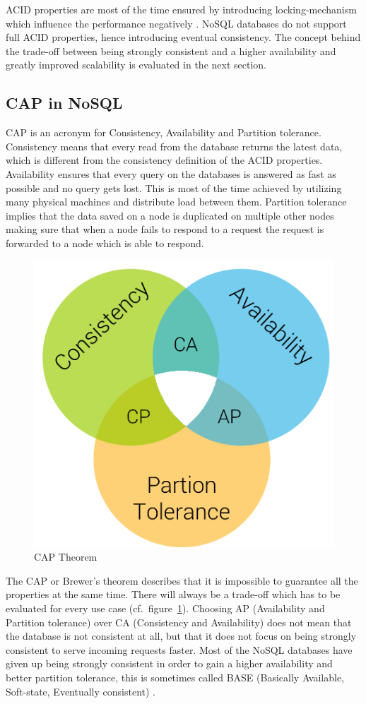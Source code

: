 ACID properties are most of the time ensured by introducing locking-mechanism which influence the performance negatively \cite[1]{hecht.2011}. NoSQL databases do not support full ACID properties, hence introducing eventual consistency. The concept behind the trade-off between being strongly consistent and a higher availability and greatly improved scalability is evaluated in the next section.


\subsection{CAP in NoSQL}
\label{subsec:cap}
CAP is an acronym for Consistency, Availability and Partition tolerance. Consistency means that every read from the database returns the latest data, which is different from the consistency definition of the ACID properties. Availability ensures that every query on the databases is answered as fast as possible and no query gets lost. This is most of the time achieved by utilizing many physical machines and distribute load between them. Partition tolerance implies that the data saved on a node is duplicated on multiple other nodes making sure that when a node fails to respond to a request the request is forwarded to a node which is able to respond. \cite[72]{pokorny.2011}

\begin{figure}[H]
  \centering
  \includegraphics[width=.4\textwidth]{Figures/cap.png}
  \caption[CAP Theorem]{CAP Theorem}
  \label{fig:cap-theorem}
\end{figure}

The CAP or Brewer's theorem describes that it is impossible to guarantee all the properties at the same time. There will always be a trade-off which has to be evaluated for every use case (cf.~figure~\ref{fig:cap-theorem}). Choosing AP (Availability and Partition tolerance) over CA (Consistency and Availability) does not mean that the database is not consistent at all, but that it does not focus on being strongly consistent to serve incoming requests faster. Most of the NoSQL databases have given up being strongly consistent in order to gain a higher availability and better partition tolerance, this is sometimes called BASE (Basically Available, Soft-state, Eventually consistent) \cite[4]{moniruzzaman.2013}.